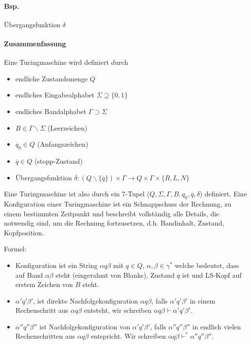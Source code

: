\paragraph*{Bsp.} Übergangsfunktion $\delta$ %

\paragraph*{Zusammenfassung} Eine Turingmaschine wird definiert durch
\begin{itemize}
	\item endliche Zustandsmenge $Q$
	\item endliches Eingabealphabet $\Sigma \supseteq \{ 0,1 \}$
	\item endliches Bandalphabet $\Gamma \supset \Sigma$
	\item $B \in \Gamma\backslash\Sigma$ (Leerzeichen)
	\item $q_0 \in Q$ (Anfangszeichen)
	\item $\overline{q} \in Q$ (stopp-Zustand)
	\item Übergangsfunktion $\delta : (Q \backslash \{ \overline{q} \}) \times \Gamma \rightarrow Q \times \Gamma \times \{ R,L,N \}$
\end{itemize}

\par\medskip Eine Turingmaschine ist also durch ein 7-Tupel ($Q,\Sigma,\Gamma,B,q_0,\overline{q},\delta$) definiert. Eine Konfiguration einer Turingmaschine ist ein Schnappschuss der Rechnung, zu einem bestimmten Zeitpunkt und beschreibt vollständig alle Details, die notwendig sind, um die Rechnung fortzusetzen, d.h. Bandinhalt, Zustand, Kopfposition.\par\medskip
Formel:
\begin{itemize}
	\item Konfiguration ist ein String $\alpha q \beta$ mit $q \in Q$, $\alpha,\beta \in \gamma^*$ welche bedeutet, dass auf Band $\alpha\beta$ steht (eingerahmt von Blanks), Zustand $q$ ist und LS-Kopf auf erstem Zeichen von $B$ steht.
	\item $\alpha'q'\beta'$, ist direkte Nachfolgekonfiguration $\alpha q \beta$, falls $\alpha'q'\beta'$ in einem Rechenschritt aus $\alpha q \beta$ entsteht, wir schreiben $\alpha q \beta \vdash \alpha'q'\beta'$.
	\item $\alpha''q''\beta''$ ist Nachfolgekonfiguration von $\alpha'q'\beta'$, falls $\alpha''q''\beta''$ in endlich vielen Rechenschritten aus $\alpha q \beta$ entspricht. Wir schreiben $\alpha q \beta \vdash^* \alpha''q''\beta''$.
\end{itemize}

